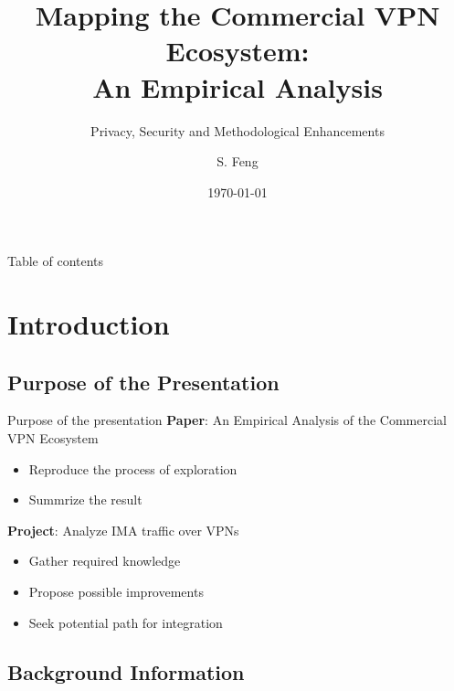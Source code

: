 \documentclass{beamer}
\title[Mapping the Commercial VPN Ecosystem]{
    Mapping the Commercial VPN Ecosystem:\\
    An Empirical Analysis
}
\subtitle[]{Privacy, Security and Methodological Enhancements}
\author[Shuo Feng]{S. Feng}
\institute[NIMS Lab]{
  NIMS Lab\\
  USRA Summer 2023}
\date{\today}
\begin{document}
\frame{\titlepage}


\begin{frame}{Table of contents}
  \tableofcontents
\end{frame}

\section{Introduction}

\subsection{Purpose of the Presentation}

\begin{frame}{Purpose of the presentation}
  \textbf{Paper}: An Empirical Analysis of the Commercial VPN Ecosystem
  \begin{itemize}
    \item Reproduce the process of exploration
    \item Summrize the result
  \end{itemize}

  \textbf{Project}: Analyze IMA traffic over \colorbox{DALYellow}{VPNs}
  \begin{itemize}
    \item Gather required knowledge
    \item Propose possible improvements
    \item Seek potential path for integration
  \end{itemize}
\end{frame}

\subsection{Background Information}
\end{document}
